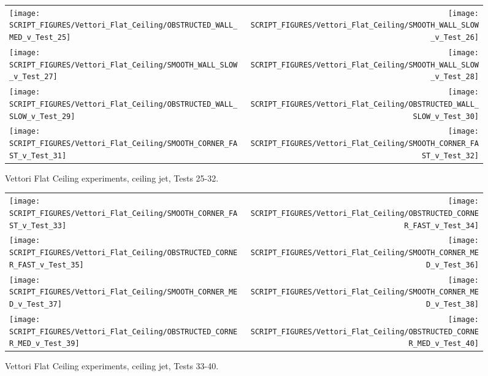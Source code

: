 \begin{figure}[p]
\begin{tabular*}{\textwidth}{l@{\extracolsep{\fill}}r}
\texttt{[image: SCRIPT\_FIGURES/Vettori\_Flat\_Ceiling/OBSTRUCTED\_WALL\_MED\_v\_Test\_25]} &
\texttt{[image: SCRIPT\_FIGURES/Vettori\_Flat\_Ceiling/SMOOTH\_WALL\_SLOW\_v\_Test\_26]} \\
\texttt{[image: SCRIPT\_FIGURES/Vettori\_Flat\_Ceiling/SMOOTH\_WALL\_SLOW\_v\_Test\_27]} &
\texttt{[image: SCRIPT\_FIGURES/Vettori\_Flat\_Ceiling/SMOOTH\_WALL\_SLOW\_v\_Test\_28]} \\
\texttt{[image: SCRIPT\_FIGURES/Vettori\_Flat\_Ceiling/OBSTRUCTED\_WALL\_SLOW\_v\_Test\_29]} &
\texttt{[image: SCRIPT\_FIGURES/Vettori\_Flat\_Ceiling/OBSTRUCTED\_WALL\_SLOW\_v\_Test\_30]} \\
\texttt{[image: SCRIPT\_FIGURES/Vettori\_Flat\_Ceiling/SMOOTH\_CORNER\_FAST\_v\_Test\_31]} &
\texttt{[image: SCRIPT\_FIGURES/Vettori\_Flat\_Ceiling/SMOOTH\_CORNER\_FAST\_v\_Test\_32]} \\
\end{tabular*}
\caption{Vettori Flat Ceiling experiments, ceiling jet, Tests 25-32.}
\label{Vettori_4}
\end{figure}

\begin{figure}[p]
\begin{tabular*}{\textwidth}{l@{\extracolsep{\fill}}r}
\texttt{[image: SCRIPT\_FIGURES/Vettori\_Flat\_Ceiling/SMOOTH\_CORNER\_FAST\_v\_Test\_33]} &
\texttt{[image: SCRIPT\_FIGURES/Vettori\_Flat\_Ceiling/OBSTRUCTED\_CORNER\_FAST\_v\_Test\_34]} \\
\texttt{[image: SCRIPT\_FIGURES/Vettori\_Flat\_Ceiling/OBSTRUCTED\_CORNER\_FAST\_v\_Test\_35]} &
\texttt{[image: SCRIPT\_FIGURES/Vettori\_Flat\_Ceiling/SMOOTH\_CORNER\_MED\_v\_Test\_36]} \\
\texttt{[image: SCRIPT\_FIGURES/Vettori\_Flat\_Ceiling/SMOOTH\_CORNER\_MED\_v\_Test\_37]} &
\texttt{[image: SCRIPT\_FIGURES/Vettori\_Flat\_Ceiling/SMOOTH\_CORNER\_MED\_v\_Test\_38]} \\
\texttt{[image: SCRIPT\_FIGURES/Vettori\_Flat\_Ceiling/OBSTRUCTED\_CORNER\_MED\_v\_Test\_39]} &
\texttt{[image: SCRIPT\_FIGURES/Vettori\_Flat\_Ceiling/OBSTRUCTED\_CORNER\_MED\_v\_Test\_40]} \\
\end{tabular*}
\caption{Vettori Flat Ceiling experiments, ceiling jet, Tests 33-40.}
\label{Vettori_5}
\end{figure}

